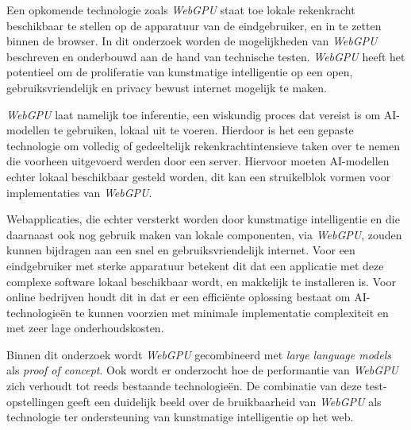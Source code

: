 \bigbreak{}

Een opkomende technologie zoals \textit{WebGPU} staat toe lokale rekenkracht beschikbaar te stellen op de apparatuur van de eindgebruiker, en in te zetten binnen de browser. In dit onderzoek worden de mogelijkheden van \textit{WebGPU} beschreven en onderbouwd aan de hand van technische testen. \textit{WebGPU} heeft het potentieel om de proliferatie van kunstmatige intelligentie op een open, gebruiksvriendelijk en privacy bewust internet mogelijk te maken.

\bigbreak{}

\textit{WebGPU} laat namelijk toe inferentie, een wiskundig proces dat vereist is om AI-modellen te gebruiken, lokaal uit te voeren. Hierdoor is het een gepaste technologie om volledig of gedeeltelijk rekenkrachtintensieve taken over te nemen die voorheen uitgevoerd werden door een server. Hiervoor moeten AI-modellen echter lokaal beschikbaar gesteld worden, dit kan een struikelblok vormen voor implementaties van \textit{WebGPU}.

\bigbreak{}

Webapplicaties, die echter versterkt worden door kunstmatige intelligentie en die daarnaast ook nog gebruik maken van lokale componenten, via \textit{WebGPU}, zouden kunnen bijdragen aan een snel en gebruiksvriendelijk internet. Voor een eindgebruiker met sterke apparatuur betekent dit dat een applicatie met deze complexe software lokaal beschikbaar wordt, en makkelijk te installeren is. Voor online bedrijven houdt dit in dat er een efficiënte oplossing bestaat om AI-tech\-no\-lo\-gieën te kunnen voorzien met minimale implementatie complexiteit en met zeer lage onderhoudskosten.

\bigbreak{}

Binnen dit onderzoek wordt \textit{WebGPU} gecombineerd met \textit{large language models} als \textit{proof of concept}. Ook wordt er onderzocht hoe de performantie van \textit{WebGPU} zich verhoudt tot reeds bestaande technologieën. De combinatie van deze test-op\-ste\-llingen geeft een duidelijk beeld over de bruikbaarheid van \textit{WebGPU} als technologie ter ondersteuning van kunstmatige intelligentie op het web.
